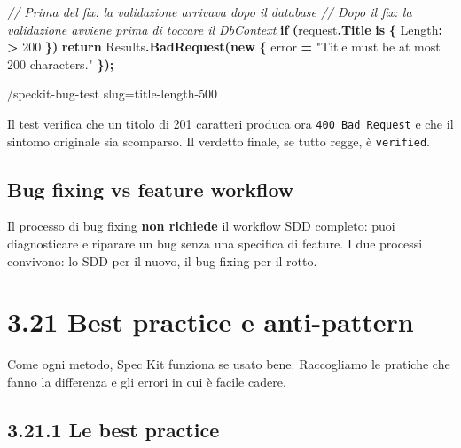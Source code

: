 \documentclass[
  italian,
  10pt,
]{book}
\newenvironment{Shaded}{\begin{snugshade}}{\end{snugshade}}
\newcommand{\CommentTok}[1]{\textcolor[rgb]{0.56,0.35,0.01}{\textit{#1}}}
\newcommand{\DecValTok}[1]{\textcolor[rgb]{0.00,0.00,0.81}{#1}}
\newcommand{\FunctionTok}[1]{\textcolor[rgb]{0.13,0.29,0.53}{\textbf{#1}}}
\newcommand{\KeywordTok}[1]{\textcolor[rgb]{0.13,0.29,0.53}{\textbf{#1}}}
\newcommand{\NormalTok}[1]{#1}
\newcommand{\OperatorTok}[1]{\textcolor[rgb]{0.81,0.36,0.00}{\textbf{#1}}}
\newcommand{\StringTok}[1]{\textcolor[rgb]{0.31,0.60,0.02}{#1}}
\begin{document}
\begin{Shaded}
\begin{Highlighting}[]
\CommentTok{// Prima del fix: la validazione arrivava dopo il database}
\CommentTok{// Dopo il fix: la validazione avviene prima di toccare il DbContext}
\KeywordTok{if} \OperatorTok{(}\NormalTok{request}\OperatorTok{.}\FunctionTok{Title} \KeywordTok{is} \OperatorTok{\{}\NormalTok{ Length}\OperatorTok{:} \OperatorTok{\textgreater{}} \DecValTok{200} \OperatorTok{\})}
    \KeywordTok{return}\NormalTok{ Results}\OperatorTok{.}\FunctionTok{BadRequest}\OperatorTok{(}\KeywordTok{new} \OperatorTok{\{}\NormalTok{ error }\OperatorTok{=} \StringTok{"Title must be at most 200 characters."} \OperatorTok{\});}
\end{Highlighting}
\end{Shaded}

\begin{Shaded}
\begin{Highlighting}[]
\NormalTok{/speckit{-}bug{-}test slug=title{-}length{-}500}
\end{Highlighting}
\end{Shaded}

Il test verifica che un titolo di 201 caratteri produca ora
\texttt{400\ Bad\ Request} e che il sintomo originale sia scomparso. Il
verdetto finale, se tutto regge, è \texttt{verified}.

\subsection{Bug fixing vs feature
workflow}\label{bug-fixing-vs-feature-workflow}

Il processo di bug fixing \textbf{non richiede} il workflow SDD
completo: puoi diagnosticare e riparare un bug senza una specifica di
feature. I due processi convivono: lo SDD per il nuovo, il bug fixing
per il rotto.

\section{3.21 Best practice e
anti-pattern}\label{best-practice-e-anti-pattern}

Come ogni metodo, Spec Kit funziona se usato bene. Raccogliamo le
pratiche che fanno la differenza e gli errori in cui è facile cadere.

\subsection{3.21.1 Le best practice}\label{le-best-practice}
\end{document}
